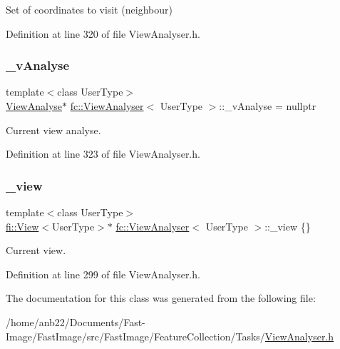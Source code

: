 Set of coordinates to visit (neighbour) 



Definition at line 320 of file View\+Analyser.\+h.

\mbox{\label{classfc_1_1ViewAnalyser_acdf4a2e6d98308f6bff77dba12ea1cc1}} 
\subsubsection{\texorpdfstring{\+\_\+v\+Analyse}{\_vAnalyse}}
{\footnotesize\ttfamily template$<$class User\+Type$>$ \\
\hyperlink{classfc_1_1ViewAnalyse}{View\+Analyse}$\ast$ \hyperlink{classfc_1_1ViewAnalyser}{fc\+::\+View\+Analyser}$<$ User\+Type $>$\+::\+\_\+v\+Analyse = nullptr\hspace{0.3cm}{\ttfamily [private]}}



Current view analyse. 



Definition at line 323 of file View\+Analyser.\+h.

\mbox{\label{classfc_1_1ViewAnalyser_a1ecb72188337c5dd826fb6abd76c7bb0}} 
\subsubsection{\texorpdfstring{\+\_\+view}{\_view}}
{\footnotesize\ttfamily template$<$class User\+Type$>$ \\
\hyperlink{classfi_1_1View}{fi\+::\+View}$<$User\+Type$>$$\ast$ \hyperlink{classfc_1_1ViewAnalyser}{fc\+::\+View\+Analyser}$<$ User\+Type $>$\+::\+\_\+view \{\}\hspace{0.3cm}{\ttfamily [private]}}



Current view. 



Definition at line 299 of file View\+Analyser.\+h.



The documentation for this class was generated from the following file\+:\begin{DoxyCompactItemize}
\item 
/home/anb22/\+Documents/\+Fast-\/\+Image/\+Fast\+Image/src/\+Fast\+Image/\+Feature\+Collection/\+Tasks/\hyperlink{ViewAnalyser_8h}{View\+Analyser.\+h}\end{DoxyCompactItemize}
